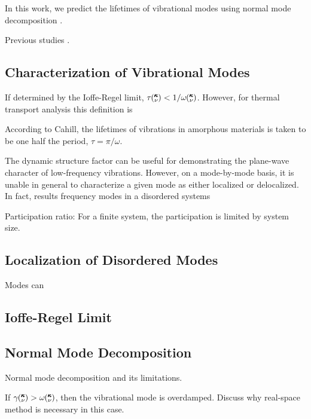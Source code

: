 \documentclass[aps,prb,preprint,superscriptaddress,amsmath,amssymb,floatfix]{revtex4}
\newcommand{\kv}{\mspace{-4.0mu}\left(\mspace{-8.0mu}
\begin{smallmatrix}&\pmb{\kappa} \\&\nu\end{smallmatrix}
\mspace{-3.0mu}\right)}
\begin{document}
In this work, we predict the lifetimes of vibrational modes using normal 
mode decomposition \cite{turney_predicting_2009-1}.


Previous studies \cite{he_heat_2011}.

\subsection{\label{S:Lifetimes:}Characterization of Vibrational Modes}

If determined by the Ioffe-Regel limit, $\tau \kv < 1/\omega \kv$.
\cite{taraskin_determination_1999} However, for thermal transport 
analysis this definition is 

According to Cahill, the lifetimes of vibrations in amorphous materials 
is taken to be one half the period, $\tau = \pi/\omega $.
\cite{cahill_heat_1989}

The dynamic structure factor can be useful for demonstrating the 
plane-wave character of low-frequency vibrations.  However, on a 
mode-by-mode basis, it is unable in general to characterize a given mode 
as either localized or delocalized.  In fact, results   
frequency modes in a disordered systems

Participation ratio:
For a finite system, the participation is limited by system size.


\subsection{\label{S:Lifetimes:}Localization of Disordered Modes}

Modes can



\subsection{\label{S:Lifetimes:}Ioffe-Regel Limit}



\subsection{\label{S:Lifetimes:}Normal Mode Decomposition}

Normal mode decomposition and its limitations.
\cite{turney_predicting_2009-1} 

If $\gamma \kv > \omega \kv$, then the vibrational mode is overdamped.  
Discuss why real-space method is necessary in this case.
\end{document}
